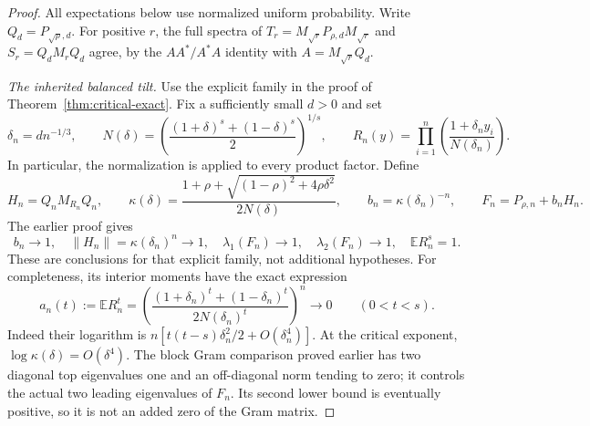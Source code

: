 \documentclass[11pt]{article}
\begin{document}
\begin{proof}
All expectations below use normalized uniform probability. Write
$Q_d=P_{\sqrt\rho,d}$. For positive $r$, the full spectra of
$T_r=M_{\sqrt r}P_{\rho,d}M_{\sqrt r}$ and $S_r=Q_dM_rQ_d$
agree, by the $AA^*/A^*A$ identity with $A=M_{\sqrt r}Q_d$.

\emph{The inherited balanced tilt.}
Use the explicit family in the proof of
Theorem~\ref{thm:critical-exact}. Fix a sufficiently small $d>0$ and set
\[
 \delta_n=dn^{-1/3},\qquad
 N(\delta)=\left(\frac{(1+\delta)^s+(1-\delta)^s}{2}\right)^{1/s},
 \qquad
 R_n(y)=\prod_{i=1}^n\left(\frac{1+\delta_n y_i}{N(\delta_n)}\right).
\]
In particular, the normalization is applied to every product factor.
Define
\[
 H_n=Q_nM_{R_n}Q_n,\qquad
 \kappa(\delta)=\frac{1+\rho+
 \sqrt{(1-\rho)^2+4\rho\delta^2}}{2N(\delta)},\qquad
 b_n=\kappa(\delta_n)^{-n},\qquad
 F_n=P_{\rho,n}+b_nH_n.
\]
The earlier proof gives
\begin{equation}\label{eq:attained-inherited}
 b_n\to1,\quad \|H_n\|=\kappa(\delta_n)^n\to1,\quad
 \lambda_1(F_n)\to1,\quad\lambda_2(F_n)\to1,
 \quad\mathbb ER_n^s=1.
\end{equation}
These are conclusions for that explicit family, not additional hypotheses.
For completeness, its interior moments have the exact expression
\[
 a_n(t):=\mathbb ER_n^t
 =\left(\frac{(1+\delta_n)^t+(1-\delta_n)^t}
 {2N(\delta_n)^t}\right)^n\longrightarrow0\qquad(0<t<s).
\]
Indeed their logarithm is
$n[t(t-s)\delta_n^2/2+O(\delta_n^4)]$.
At the critical exponent, $\log\kappa(\delta)=O(\delta^4)$.
The block Gram comparison proved earlier has two diagonal top
eigenvalues one and an off-diagonal norm tending to zero; it controls
the actual two leading eigenvalues of $F_n$. Its second lower bound
is eventually positive, so it is not an added zero of the Gram matrix.


\end{proof}
\end{document}
